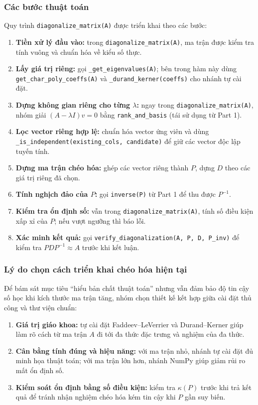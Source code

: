 \documentclass[a4paper]{article}
\begin{document}
\subsubsection{Các bước thuật toán}

Quy trình \texttt{diagonalize\_matrix(A)} được triển khai theo các bước:
\begin{enumerate}
    \item \textbf{Tiền xử lý đầu vào:} trong \texttt{diagonalize\_matrix(A)}, ma trận được kiểm tra tính vuông và chuẩn hóa về kiểu số thực.
    \item \textbf{Lấy giá trị riêng:} gọi \texttt{\_get\_eigenvalues(A)}; bên trong hàm này dùng \texttt{get\_char\_poly\_coeffs(A)} và \texttt{\_durand\_kerner(coeffs)} cho nhánh tự cài đặt.
    \item \textbf{Dựng không gian riêng cho từng $\lambda$:} ngay trong \texttt{diagonalize\_matrix(A)}, nhóm giải $(A-\lambda I)v=0$ bằng \texttt{rank\_and\_basis} (tái sử dụng từ Part 1).
    \item \textbf{Lọc vector riêng hợp lệ:} chuẩn hóa vector ứng viên và dùng \texttt{\_is\_independent(existing\_cols, candidate)} để giữ các vector độc lập tuyến tính.
    \item \textbf{Dựng ma trận chéo hóa:} ghép các vector riêng thành $P$, dựng $D$ theo các giá trị riêng đã chọn.
    \item \textbf{Tính nghịch đảo của $P$:} gọi \texttt{inverse(P)} từ Part 1 để thu được $P^{-1}$.
    \item \textbf{Kiểm tra ổn định số:} vẫn trong \texttt{diagonalize\_matrix(A)}, tính số điều kiện xấp xỉ của $P$; nếu vượt ngưỡng thì báo lỗi.
    \item \textbf{Xác minh kết quả:} gọi \texttt{verify\_diagonalization(A, P, D, P\_inv)} để kiểm tra $PDP^{-1} \approx A$ trước khi kết luận.
\end{enumerate}

\subsubsection{Lý do chọn cách triển khai chéo hóa hiện tại}

Để bám sát mục tiêu ``hiểu bản chất thuật toán'' nhưng vẫn đảm bảo độ tin cậy số học khi kích thước ma trận tăng, nhóm chọn thiết kế kết hợp giữa cài đặt thủ công và thư viện chuẩn:
\begin{enumerate}
    \item \textbf{Giá trị giáo khoa:} tự cài đặt Faddeev--LeVerrier và Durand--Kerner giúp làm rõ cách từ ma trận $A$ đi tới đa thức đặc trưng và nghiệm của đa thức.
    \item \textbf{Cân bằng tính đúng và hiệu năng:} với ma trận nhỏ, nhánh tự cài đặt đủ minh họa thuật toán; với ma trận lớn hơn, nhánh NumPy giúp giảm rủi ro mất ổn định số.
    \item \textbf{Kiểm soát ổn định bằng số điều kiện:} kiểm tra \(\kappa(P)\) trước khi trả kết quả để tránh nhận nghiệm chéo hóa kém tin cậy khi $P$ gần suy biến.
\end{enumerate}
\end{document}
